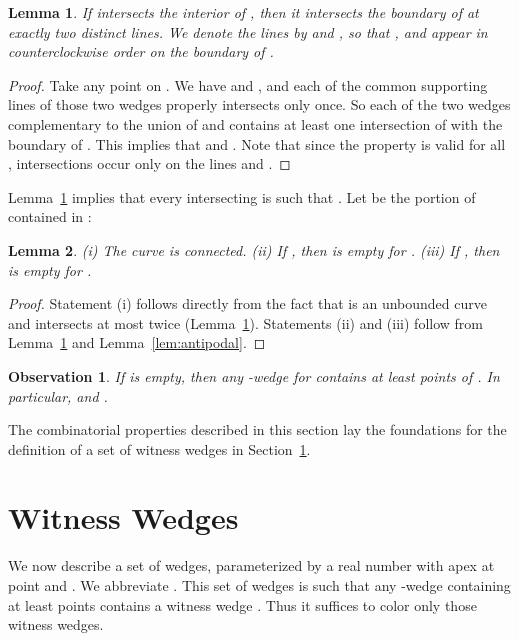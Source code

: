 \documentclass[english,11pt]{article}
\newtheorem{lemma}{Lemma}
\newtheorem{observation}{Observation}
\begin{document}
\begin{lemma}\label{lem:C_and_T}
If   intersects the interior of
, then it intersects the boundary of  at exactly two distinct lines.
We denote the lines by  and , so that ,  and  appear in counterclockwise order on the boundary of .
\end{lemma}
\begin{proof}

Take any point  on . We have  and , and each of the common
supporting lines of those two wedges  properly intersects  only once. 
So each of the two wedges complementary to the union of  and  contains at least one
intersection of  with the boundary of . 
This implies that   and .
Note that since  the property is valid for all , intersections occur only on the lines  and .
\end{proof}

\noindent Lemma~\ref{lem:C_and_T} implies that every  intersecting  is such that .
Let  be the portion of  contained in :


\begin{lemma}
(i) The curve  is connected. 
(ii) If , then  is empty for . 
(iii) If , then  is empty for .
\end{lemma}

\begin{proof}
Statement (i) follows directly from the fact that 
is an unbounded curve and intersects  at most twice
(Lemma~\ref{lem:C_and_T}). 
Statements (ii) and (iii) follow from Lemma~\ref{lem:C_and_T} and Lemma~\ref{lem:antipodal}.
\end{proof}

\begin{observation}
\label{obs:witnessvi}
If  is empty, then any -wedge  for 
contains at least  points of . In particular,  and .
\end{observation}

The combinatorial properties described in this section lay the foundations for the definition of a set of witness wedges in Section~\ref{sec:wedges}.

\section{Witness Wedges}
\label{sec:wedges}

We now describe a set of wedges, parameterized by a real number
 with apex at point  and  
. We abbreviate .
This set of wedges is such that any -wedge containing at
least  points contains a witness wedge .
Thus it suffices to color only those witness wedges.
\end{document}
